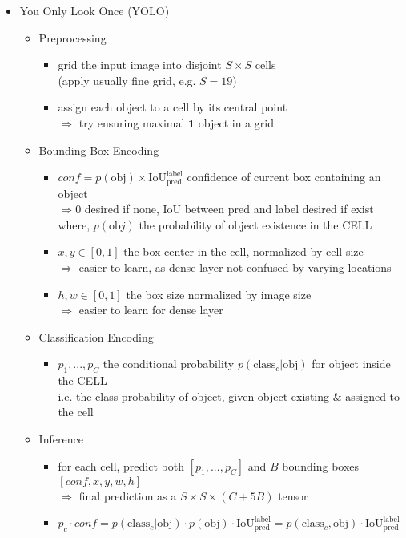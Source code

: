 \begin{itemize}
\item You Only Look Once (YOLO)
	\begin{itemize}
	\item Preprocessing
		\begin{itemize}
		\item grid the input image into disjoint $S \times S$ cells \\
		(apply usually fine grid, e.g. $S=19$)
		\item assign each object to a cell by its central point \\ 
		$\Rightarrow$ try ensuring maximal $\mathbf 1$ object in a grid
		\end{itemize}
	\item Bounding Box Encoding
		\begin{itemize}
		\item $conf=p(\text{obj}) \times \text{IoU}^\text{label}_\text{pred}$ confidence of current box containing an object \\
		$\Rightarrow 0$ desired if none, IoU between pred and label desired if exist \\
		where, $p(\text{ob}j)$ the probability of object existence in the CELL
		\item $x, y \in [0,1]$ the box center in the cell, normalized by cell size \\
		$\Rightarrow$ easier to learn, as dense layer not confused by varying locations
		\item $h, w \in [0, 1]$ the box size normalized by image size \\
		$\Rightarrow$ easier to learn for dense layer
		\end{itemize}
	\item Classification Encoding
		\begin{itemize}
		\item $p_1,...,p_C$ the conditional probability $p(\text{class}_c|\text{obj})$ for object inside the CELL \\
		i.e. the class probability of object, given object existing \& assigned to the cell
		\end{itemize}
	\item Inference
		\begin{itemize}
		\item for each cell, predict both $[p_1,...,p_C]$ and $B$ bounding boxes $[conf, x, y, w, h]$ \\
		$\Rightarrow$ final prediction as a $S\times S \times (C+5B)$ tensor
		\item $p_c\cdot conf = p(\text{class}_c|\text{obj})\cdot p(\text{obj})\cdot \text{IoU}^\text{label}_\text{pred} = p(\text{class}_c, \text{obj}) \cdot \text{IoU}^\text{label}_\text{pred}$ \\

\end{itemize}
\end{itemize}
\end{itemize}
